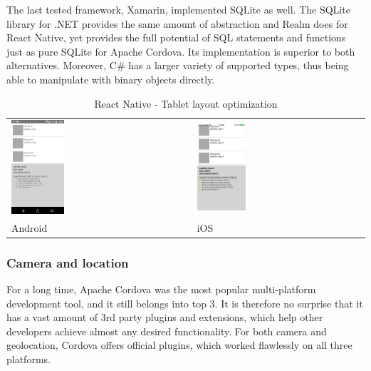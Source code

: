 \documentclass[english,master,public,dept460,male,cpdeclaration,oneside]{diploma}
\begin{document}
The last tested framework, Xamarin, implemented SQLite as well. The SQLite library for .NET provides the same amount of abstraction and Realm does for React Native, yet provides the full potential of SQL statements and functions just as pure SQLite for Apache Cordova. Its implementation is superior to both alternatives. Moreover, C\# has a larger variety of supported types, thus being able to manipulate with binary objects directly.

\begin{table}[!h]
	\centering
	\caption{React Native - Tablet layout optimization}
	\label{table:uis}
	\begin{tabular}{p{5cm} | p{5cm}  }
		\toprule		
		\includegraphics[width=0.3\textwidth]{Figures/react6android.PNG}
		& \includegraphics[width=0.3\textwidth]{Figures/react6ios.jpg}
		\\
		Android & iOS \\
		\midrule
	\end{tabular}
\end{table}

\subsubsection{Camera and location}
For a long time, Apache Cordova was the most popular multi-platform development tool, and it still belongs into top 3. It is therefore no surprise that it has a vast amount of 3rd party plugins and extensions, which help other developers achieve almost any desired functionality. For both camera and geolocation, Cordova offers official plugins, which worked flawlessly on all three platforms.
\end{document}
